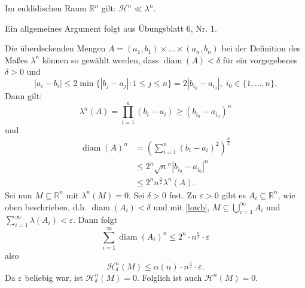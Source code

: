 \documentclass[a4paper,twoside,DIV15,BCOR12mm]{scrbook}
\newcommand{\HM}{\mathscr H}
\DeclareMathOperator{\diam}{diam}
\begin{document}
\begin{lemma}\label{lem:2.28}
Im euklidischen Raum \(\mathbb R^n\) gilt: \(\HM^n \ll \lambda^n\).
\end{lemma}
\begin{beweis}
Ein allgemeines Argument folgt aus Übungsblatt 6, Nr. 1.
\par
Die überdeckenden Mengen \(A=(a_1,b_1) \times \dots \times (a_n,b_n)\) bei der Definition des Maßes \(\lambda^n\) können so gewählt werden, dass \(\diam(A) < \delta\) für ein vorgegebenes \(\delta > 0\) und
\begin{equation}\label{lowb}
 |a_i-b_i| \leq 2 \min\{|b_j-a_j| \colon 1 \leq j \leq n\} = 2|b_{i_0}-a_{i_0}|, \; i_0 \in \{1,\dots,n\}.
\end{equation}
Dann gilt:
\[
\lambda^n(A) = \prod_{i=1}^n(b_i-a_i) \geq (b_{i_0}-a_{i_0})^n
\]
und
\begin{align*}
\diam(A)^n &= \left( \sum_{i=1}^n (b_i-a_i)^2 \right)^{\frac{n}2} \\
&\leq 2^n {\sqrt n}^n |b_{i_0}-a_{i_0}|^n \\
&\leq 2^n n^{\frac{n}2} \lambda^n(A).
\end{align*}
Sei nun \(M \subseteq \mathbb R^n\) mit \(\lambda^n(M)=0\). Sei \(\delta > 0\) fest. Zu \(\varepsilon > 0\) gibt es \(A_i \subseteq \mathbb R^n\), wie oben beschrieben, d.h. \(\diam(A_i) < \delta\) und mit \eqref{lowb}, \(M \subseteq \bigcup_{i=1}^\infty A_i\) und \(\sum_{i=1}^\infty \lambda(A_i) < \varepsilon\). Dann folgt
$$ \sum_{i=1}^\infty \diam(A_i)^n \leq 2^n \cdot n^{\frac{n}2} \cdot \varepsilon 
$$
also
$$ 
\HM^n_\delta(M) \leq \alpha(n) \cdot  n^{\frac{n}2} \cdot \varepsilon. 
$$
Da \(\varepsilon\) beliebig war, ist \(\HM^n_\delta(M)=0\). Folglich ist auch \(\HM^n(M)=0\).
\end{beweis}
\end{document}
